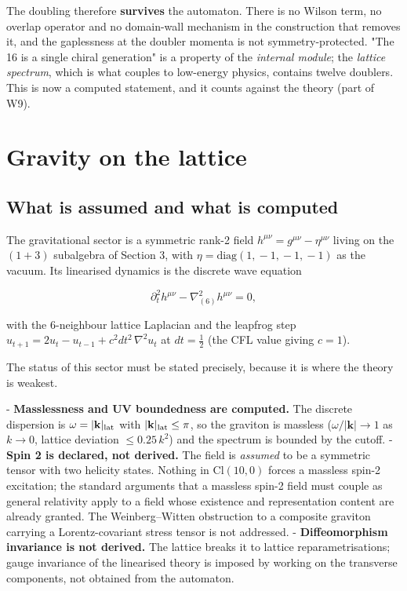 \documentclass[aps,prd,amsmath,amssymb,superscriptaddress,longbibliography,floatfix,preprint]{revtex4-2}
\begin{document}
The doubling therefore \textbf{survives} the automaton. There is no Wilson term, no overlap operator \cite{ref48} and no domain-wall mechanism in the construction that removes it, and the gaplessness at the doubler momenta is not symmetry-protected. "The 16 is a single chiral generation" is a property of the \emph{internal module}; the \emph{lattice spectrum}, which is what couples to low-energy physics, contains twelve doublers. This is now a computed statement, and it counts against the theory (part of W9).

\section{Gravity on the lattice}

\subsection{What is assumed and what is computed}

The gravitational sector is a symmetric rank-2 field $h^{\mu\nu} = g^{\mu\nu} - \eta^{\mu\nu}$ living on the $(1{+}3)$ subalgebra of Section 3, with $\eta = \mathrm{diag}(1,\allowbreak{}-1,\allowbreak{}-1,\allowbreak{}-1)$ as the vacuum. Its linearised dynamics is the discrete wave equation

\[\partial_t^2 h^{\mu\nu} - \nabla^2_{(6)} h^{\mu\nu} = 0,\]

with the 6-neighbour lattice Laplacian and the leapfrog step $u_{t+1} = 2u_t - u_{t-1} + c^2 dt^2\,\allowbreak{}\nabla^2 u_t$ at $dt = \tfrac12$ (the CFL value giving $c = 1$).

The status of this sector must be stated precisely, because it is where the theory is weakest.

- \textbf{Masslessness and UV boundedness are computed.} The discrete dispersion is $\omega = |\mathbf{k}|_{\rm lat}$ with $|\mathbf{k}|_{\rm lat} \le \pi$, so the graviton is massless ($\omega/|\mathbf{k}| \to 1$ as $k \to 0$, lattice deviation $\le 0.25\,\allowbreak{}k^2$) and the spectrum is bounded by the cutoff. - \textbf{Spin 2 is declared, not derived.} The field is \emph{assumed} to be a symmetric tensor with two helicity states. Nothing in $\mathrm{Cl}(10,\allowbreak{}0)$ forces a massless spin-2 excitation; the standard arguments that a massless spin-2 field must couple as general relativity \cite{ref20} apply to a field whose existence and representation content are already granted. The Weinberg--Witten obstruction to a composite graviton carrying a Lorentz-covariant stress tensor \cite{ref21} is not addressed. - \textbf{Diffeomorphism invariance is not derived.} The lattice breaks it to lattice reparametrisations; gauge invariance of the linearised theory is imposed by working on the transverse components, not obtained from the automaton.
\end{document}
